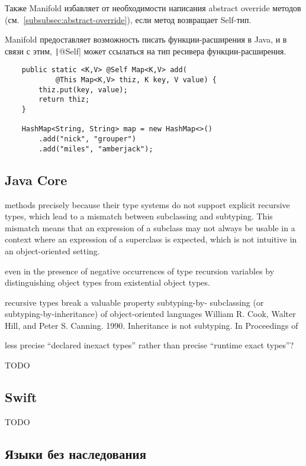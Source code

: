Также Manifold избавляет от необходимости написания abstract override методов (см.~\ref{subsubsec:abstract-override}), если метод возвращает Self-тип.

Manifold предоставляет возможность писать функции-расширения в Java, и в связи с этим, \texttt|@Self| может ссылаться на тип ресивера функции-расширения.

\begin{verbatim}
    public static <K,V> @Self Map<K,V> add(
            @This Map<K,V> thiz, K key, V value) {
        thiz.put(key, value);
        return thiz;
    }

    HashMap<String, String> map = new HashMap<>()
        .add("nick", "grouper")
        .add("miles", "amberjack");
\end{verbatim}

\subsection{Java Core}

methods precisely because their type systems
do not support explicit recursive types, which lead to a mismatch between subclassing and subtyping. This
mismatch means that an expression of a subclass may not always be usable in a context where an expression
of a superclass is expected, which is not intuitive in an object-oriented setting.

even in the presence of negative occurrences of type
recursion variables by distinguishing object types from existential object types.

recursive types break a valuable property subtyping-by-
subclassing (or subtyping-by-inheritance) of object-oriented languages
William R. Cook, Walter Hill, and Peter S. Canning. 1990. Inheritance is not subtyping. In Proceedings of

less precise “declared inexact types” rather than precise “runtime
exact types”?

TODO %

\cite{ryu2016thistype}

\subsection{Swift}

TODO %

\subsection{Языки без наследования}

